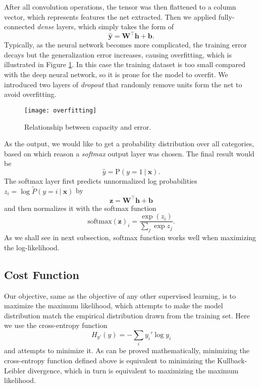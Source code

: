 After all convolution operations, the tensor was then flattened to a column vector, which represents features the net extracted. Then we applied fully-connected \emph{dense} layers, which simply takes the form of
\[
\hat{\boldsymbol{y}} = \boldsymbol{W}^\top \boldsymbol{h} + \boldsymbol{b}\textrm{.}
\]
Typically, as the neural network becomes more complicated, the training error decays but the generalization error increases, causing overfitting\cite{dlbook}, which is illustrated in Figure \ref{fig:overfitting}. In this case the training dataset is too small compared with the deep neural network, so it is prone for the model to overfit. We introduced two layers of \emph{dropout}\cite{srivastava2014dropout} that randomly remove units form the net to avoid overfitting.

\begin{figure}[htbp]
\centering
\texttt{[image: overfitting]}
\caption{Relationship between capacity and error\cite{dlbook}.}
\label{fig:overfitting}
\end{figure}

As the output, we would like to get a probability distribution over all categories, based on which reason a \emph{softmax} output layer was chosen. The final result would be
\[
\hat{y} = \mathrm{P}(y=1~|~\boldsymbol{x})\textrm{.}
\]
The softmax layer first predicts unnormalized log probabilities $z_i = \log\tilde{P}(y=i~|~\boldsymbol{x})$ by
\[
    \boldsymbol{z} = \boldsymbol{W}^\top \boldsymbol{h} + \boldsymbol{b}
\]
and then normalizes it with the softmax function
\[
    \textrm{softmax}(\boldsymbol{z})_i = \frac{\exp(z_i)}{\sum_j\exp{z_j}}\textrm{.}
\]
As we shall see in next subsection, softmax function works well when maximizing the log-likelihood.
\subsection{Cost Function}
Our objective, same as the objective of any other supervised learning, is to maximize the maximum likelihood, which attempts to make the model distribution match the empirical distribution drawn from the training set. Here we use the cross-entropy function
\[
    H_{y'}(y) = -\sum_{i}y_{i}'\log{y_i}
\]
and attempts to minimize it. As can be proved mathematically, minimizing the cross-entropy function defined above is equivalent to minimizing the Kullback-Leibler divergence, which in turn is equivalent to maximizing the maximum likelihood\cite{dlbook}.
